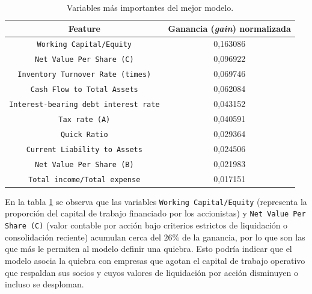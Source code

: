 \begin{table}[H]
	\centering
	\caption[Variables más importantes del mejor modelo]{Variables más importantes del mejor modelo.}
    \begin{tabularx}{\textwidth}{c c}
		\toprule
		\textbf{Feature} & \textbf{Ganancia (\textit{gain}) normalizada} \\
		\midrule
        \texttt{Working Capital/Equity} &   0,163086 \\
        \texttt{Net Value Per Share (C)} &  0,096922\\
        \texttt{Inventory Turnover Rate (times)} &  0,069746 \\
        \texttt{Cash Flow to Total Assets} &  0,062084 \\
        \texttt{Interest-bearing debt interest rate} &  0,043152 \\
        \texttt{Tax rate (A)} & 0,040591 \\
        \texttt{Quick Ratio} &  0,029364 \\
        \texttt{Current Liability to Assets} & 0,024506 \\
        \texttt{Net Value Per Share (B)} &  0,021983 \\
        \texttt{Total income/Total expense} &  0,017151 \\
		\bottomrule
		\hline
    \end{tabularx}
	\label{tab:var_importance_best_model}
\end{table}



En la tabla \ref{tab:var_importance_best_model} se observa que las variables \texttt{Working Capital/Equity} (representa la proporción del capital de trabajo financiado por los accionistas) y \texttt{Net Value Per Share (C)} (valor contable por acción bajo criterios estrictos de liquidación o consolidación reciente) acumulan cerca del $26\%$ de la ganancia, por lo que son las que más le permiten al modelo definir una quiebra. Esto podría indicar que el modelo asocia la quiebra con empresas que agotan el capital de trabajo operativo que respaldan sus socios y cuyos valores de liquidación por acción disminuyen o incluso se desploman.

